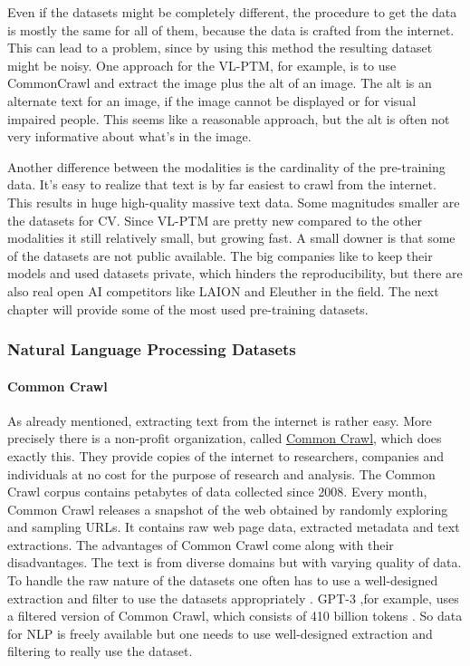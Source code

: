 \documentclass[
]{krantz}
\begin{document}
Even if the datasets might be completely different, the procedure to get the data is mostly the same for all of them, because the data is crafted from the internet. This can lead to a problem, since by using this method the resulting dataset might be noisy. One approach for the VL-PTM, for example, is to use CommonCrawl and extract the image plus the alt of an image. The alt is an alternate text for an image, if the image cannot be displayed or for visual impaired people. This seems like a reasonable approach, but the alt is often not very informative about what's in the image.

Another difference between the modalities is the cardinality of the pre-training data. It's easy to realize that text is by far easiest to crawl from the internet. This results in huge high-quality massive text data. Some magnitudes smaller are the datasets for CV. Since VL-PTM are pretty new compared to the other modalities it still relatively small, but growing fast. A small downer is that some of the datasets are not public available. The big companies like to keep their models and used datasets private, which hinders the reproducibility, but there are also real open AI competitors like LAION and Eleuther in the field. The next chapter will provide some of the most used pre-training datasets.

\hypertarget{natural-language-processing-datasets}{%
\subsubsection{Natural Language Processing Datasets}\label{natural-language-processing-datasets}}

\hypertarget{common-crawl}{%
\paragraph{Common Crawl}\label{common-crawl}}

As already mentioned, extracting text from the internet is rather easy. More precisely there is a non-profit organization, called \href{https://commoncrawl.org}{Common Crawl}, which does exactly this. They provide copies of the internet to researchers, companies and individuals at no cost for the purpose of research and analysis. The Common Crawl corpus contains petabytes of data collected since 2008. Every month, Common Crawl releases a snapshot of the web obtained by randomly exploring and sampling URLs. It contains raw web page data, extracted metadata and text extractions. The advantages of Common Crawl come along with their disadvantages. The text is from diverse domains but with varying quality of data. To handle the raw nature of the datasets one often has to use a well-designed extraction and filter to use the datasets appropriately \citep{gao2020pile}. GPT-3 ,for example, uses a filtered version of Common Crawl, which consists of 410 billion tokens \citep{brown2020language}. So data for NLP is freely available but one needs to use well-designed extraction and filtering to really use the dataset.
\end{document}
